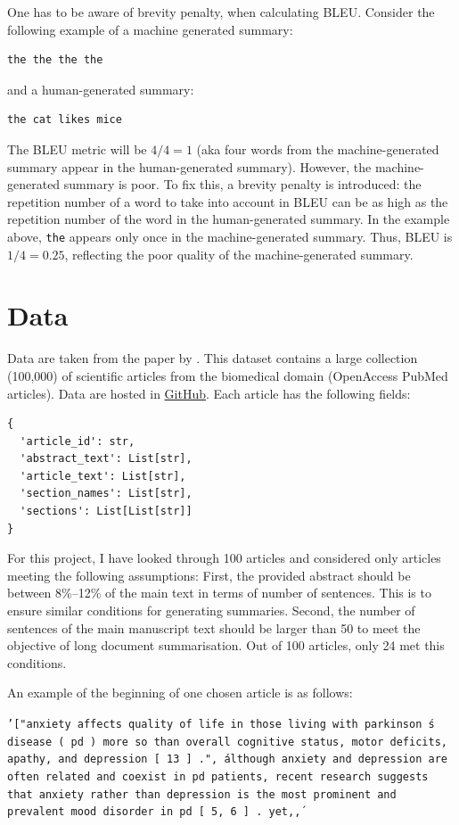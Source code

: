 \documentclass[11pt]{article}
\begin{document}
One has to be aware of brevity penalty, when calculating BLEU. Consider the following example of a machine generated summary: \begin{verbatim}the the the the\end{verbatim} and a human-generated summary: \begin{verbatim}the cat likes mice\end{verbatim} The BLEU metric will be $4/4 = 1$ (aka four words from the machine-generated summary appear in the human-generated summary). However, the machine-generated summary is poor. To fix this, a brevity penalty is introduced: the repetition number of a word to take into account in BLEU can be as high as the repetition number of the word in the human-generated summary. In the example above, \texttt{the} appears only once in the machine-generated summary. Thus, BLEU is $1/4=0.25$, reflecting the poor quality of the machine-generated summary.

\section{Data}
\label{sect:data}

Data are taken from the paper by \citet{cohan2018discourse}. This dataset contains a large collection (100,000) of scientific articles from the biomedical domain (OpenAccess PubMed articles). Data are hosted in \href{https://github.com/armancohan/long-summarization}{GitHub}. Each article has the following fields: 
\begin{verbatim}
{ 
  'article_id': str,
  'abstract_text': List[str],
  'article_text': List[str],
  'section_names': List[str],
  'sections': List[List[str]]
}
\end{verbatim}

For this project, I have looked through 100 articles and considered only articles meeting the following assumptions: First, the provided abstract should be between 8\%--12\% of the main text in terms of number of sentences. This is to ensure similar conditions for generating summaries. Second, the number of sentences of the main manuscript text should be larger than 50 to meet the objective of long document summarisation. Out of 100 articles, only 24 met this conditions.

An example of the beginning of one chosen article is as follows:

\texttt{'["anxiety affects quality of life in those living with parkinson \'s disease ( pd ) more so than overall cognitive status, motor deficits, apathy, and depression [ 13 ] .", \'although anxiety and depression are often related and coexist in pd patients, recent research suggests that anxiety rather than depression is the most prominent and prevalent mood disorder in pd [ 5, 6 ] . yet,\', }
\end{document}
